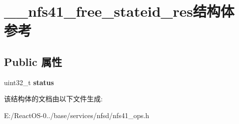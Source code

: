 \hypertarget{struct____nfs41__free__stateid__res}{}\section{\+\_\+\+\_\+nfs41\+\_\+free\+\_\+stateid\+\_\+res结构体 参考}
\label{struct____nfs41__free__stateid__res}
\subsection*{Public 属性}
\begin{DoxyCompactItemize}
\item 
\mbox{\label{struct____nfs41__free__stateid__res_a2bb3a9c11561b43d79612fd95143b561}} 
uint32\+\_\+t {\bfseries status}
\end{DoxyCompactItemize}


该结构体的文档由以下文件生成\+:\begin{DoxyCompactItemize}
\item 
E\+:/\+React\+O\+S-\/0../base/services/nfsd/nfs41\+\_\+ops.\+h\end{DoxyCompactItemize}
